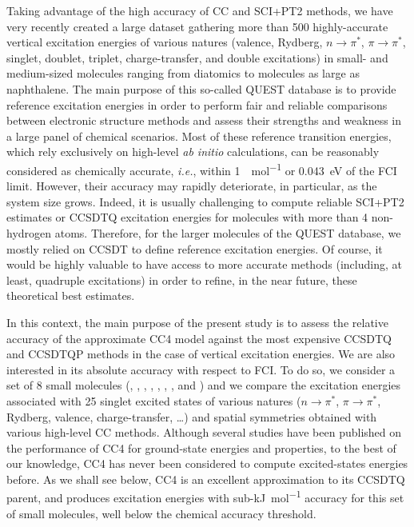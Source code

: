 \documentclass[aip,jcp,reprint,noshowkeys,superscriptaddress]{revtex4-1}
\newcommand{\ie}{\textit{i.e.}}
\newcommand{\npis}{n \to \pi^*}
\newcommand{\pipis}{\pi \to \pi^*}
\begin{document}
Taking advantage of the high accuracy of CC and SCI+PT2 methods, we have very recently created a large dataset gathering more than 500 highly-accurate vertical excitation energies of various natures (valence, Rydberg, $\npis$, $\pipis$, singlet, doublet, triplet, charge-transfer, and double excitations) in small- and medium-sized molecules ranging from diatomics to molecules as large as naphthalene. 
The main purpose of this so-called QUEST database is to provide reference excitation energies in order to perform fair and reliable comparisons between electronic structure methods and assess their strengths and weakness in a large panel of chemical scenarios.
Most of these reference transition energies, which rely exclusively on high-level \textit{ab initio} calculations, can be reasonably considered as chemically accurate, \ie, within \SI{1}{\kcal\per\mol} or \SI{0.043}{\eV} of the FCI limit.
However, their accuracy may rapidly deteriorate, in particular, as the system size grows.
Indeed, it is usually challenging to compute reliable SCI+PT2 estimates or CCSDTQ excitation energies for molecules with more than 4 non-hydrogen atoms.
Therefore, for the larger molecules of the QUEST database, we mostly relied on CCSDT to define reference excitation energies.
Of course, it would be highly valuable to have access to more accurate methods (including, at least, quadruple excitations) in order to refine, in the near future, these theoretical best estimates.

In this context, the main purpose of the present study is to assess the relative accuracy of the approximate CC4 model against the most expensive CCSDTQ and CCSDTQP methods in the case of vertical excitation energies.
We are also interested in its absolute accuracy with respect to FCI.
To do so, we consider a set of 8 small molecules (, , , , , , , and ) and we compare the excitation energies associated with 25 singlet excited states of various natures ($\npis$, $\pipis$, Rydberg, valence, charge-transfer, \ldots) and spatial symmetries obtained with various high-level CC methods.
Although several studies have been published on the performance of CC4 for ground-state energies and properties, to the best of our knowledge, CC4 has never been considered to compute excited-states energies before.
As we shall see below, CC4 is an excellent approximation to its CCSDTQ parent, and produces excitation energies with sub-\si{\kJ\per\mol} accuracy for this set of small molecules, well below the chemical accuracy threshold.
\end{document}
